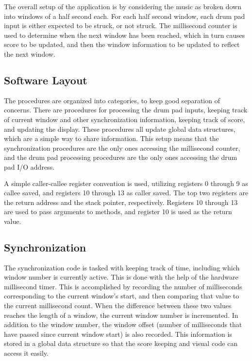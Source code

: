 \documentclass{subfile}
\begin{document}
  The overall setup of the application is by considering the music as broken down into 
  windows of a half second each. 
  For each half second window, each drum pad input is either expected to be struck, or not 
  struck.
  The millisecond counter is used to determine when the next window has been reached, which 
  in turn causes score to be updated, and then the window information to be updated to reflect 
  the next window.

  \subsection{Software Layout} 
  The procedures are organized into categories, to keep good separation of concerns. 
  There are procedures for processing the drum pad inputs, keeping track of current window and 
  other synchronization information, keeping track of score, and updating the display. 
  These procedures all update global data structures, which are a simple way to share information. 
  This setup means that the synchronization procedures are the only ones accessing the millisecond 
  counter, and the drum pad processing procedures are the only ones accessing the drum pad I/O address.

  A simple caller-callee register convention is used, utilizing registers 0 through 9 as callee 
  saved, and registers 10 through 13 as caller saved.
  The top two registers are the return address and the stack pointer, respectively.
  Registers 10 through 13 are used to pass arguments to methods, and register 10 is used 
  as the return value.

  \subsection{Synchronization} 
  The synchronization code is tasked with keeping track of time, including which window number 
  is currently active. 
  This is done with the help of the hardware millisecond timer. 
  This is accomplished by recording the number of milliseconds corresponding to the 
  current window's start, and then comparing that value to the current millisecond count. 
  When the difference between these two values reaches the length of a window, the current 
  window number is incremented. 
  In addition to the window number, the window offset (number of milliseconds that have passed 
  since current window start) is also recorded.
  This information is stored in a global data structure so that the score keeping and visual 
  code can access it easily.
\end{document}
